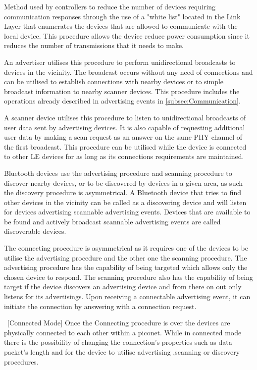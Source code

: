 \begin{description}
\item [Device Filtering Procedure] Method used by controllers to reduce the number of devices requiring communication responses through the use of a "white list" located in the Link Layer that enumerates the devices that are allowed to communicate with the local device. This procedure allows the device reduce power consumption since it reduces the number of transmissions that it needs to make.

\item [Advertising Procedure] An advertiser utilises this procedure to perform unidirectional broadcasts to devices in the vicinity. The broadcast occurs without any need of connections and can be utilised to establish connections with nearby devices or to simple broadcast information to nearby scanner devices. This procedure includes the operations already described in advertising events in \ref{subsec:Communication}.

\item [Scanning Procedure] A scanner device utilises this procedure to listen to unidirectional broadcasts of user data sent by advertising devices. It is also capable of requesting additional user data by making a scan request as an answer on the same \ac{PHY} channel of the first broadcast. This procedure can be utilised while the device is connected to other \ac{LE} devices for as long as its connections requirements are maintained.

\item [Discovering Procedure] Bluetooth devices use the advertising procedure and scanning procedure to discover nearby devices, or to be discovered by devices in a given area, as such the discovery procedure is asymmetrical. A Bluetooth device that tries to find other devices in the vicinity can be called as a discovering device and will listen for devices advertising scannable advertising events. Devices that are available to be found and actively broadcast scannable advertising events are called discoverable devices. 

\item [Connecting Procedure] The connecting procedure is asymmetrical as it requires one of the devices to be utilise the advertising procedure and the other one the scanning procedure. The advertising procedure has the capability of being targeted which allows only the chosen device to respond.  The scanning procedure also has the capability of being target if the device discovers an advertising device and from there on out only listens for its advertisings. Upon receiving a connectable advertising event, it can initiate the connection by answering with a connection request.

\item [Connected Mode] Once the Connecting procedure is over the devices are physically connected to each other within a piconet. While in connected mode there is the possibility of changing the connection's properties such as data packet's length and for the device to utilise advertising ,scanning or discovery procedures.
\end{description}

